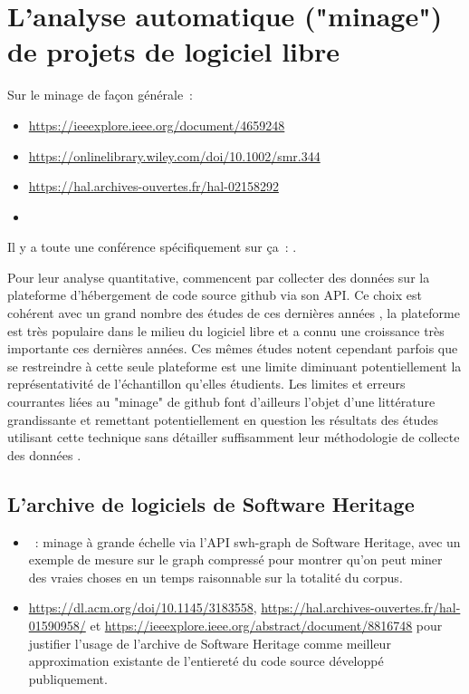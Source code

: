 \section{L'analyse automatique ("minage") de projets de logiciel libre}

Sur le minage de façon générale :

\begin{itemize}
    \item \url{https://ieeexplore.ieee.org/document/4659248}
    \item \url{https://onlinelibrary.wiley.com/doi/10.1002/smr.344}
    \item \url{https://hal.archives-ouvertes.fr/hal-02158292}
    \item {}
\end{itemize}

Il y a toute une conférence spécifiquement sur ça : .

Pour leur analyse quantitative, \textcite{signals-2019} commencent par collecter des données sur la plateforme
d'hébergement de code source \gls{github} via son \gls{API}. Ce choix est cohérent avec un grand nombre des
études de ces dernières années , la plateforme est très populaire dans le
milieu du logiciel libre et a connu une croissance très importante ces dernières années. Ces mêmes études
notent cependant parfois que se restreindre à cette seule plateforme est une limite diminuant potentiellement
la représentativité de l'échantillon qu'elles étudients. Les limites et erreurs courrantes liées au "minage"
de \gls{github} font d'ailleurs l'objet d'une littérature grandissante et remettant potentiellement en
question les résultats des études utilisant cette technique sans détailler suffisamment leur méthodologie de
collecte des données \parencites{mining-github-2014}{penumbra-oss-2022}.

\subsection{L'archive de logiciels de Software Heritage}


\begin{itemize}
    \item {} : minage à grande échelle via l'API swh-graph de Software Heritage,
        avec un exemple de mesure sur le graph compressé pour montrer qu'on peut miner des vraies choses en un
        temps raisonnable sur la totalité du corpus.
    \item \url{https://dl.acm.org/doi/10.1145/3183558}, \url{https://hal.archives-ouvertes.fr/hal-01590958/}
        et \url{https://ieeexplore.ieee.org/abstract/document/8816748} pour justifier l'usage de l'archive de
        Software Heritage comme meilleur approximation existante de l'entiereté du code source développé
        publiquement.
\end{itemize}

